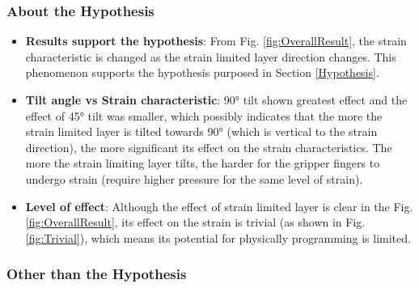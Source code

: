 \documentclass[conference]{IEEEtran}
\begin{document}
\subsubsection{About the Hypothesis}
\begin{itemize}
    \item \textbf{Results support the hypothesis}: From Fig. \ref{fig:OverallResult}, the strain characteristic is changed as the strain limited layer direction changes. This phenomenon supports the hypothesis purposed in Section \ref{Hypothesis}. 
    \item \textbf{Tilt angle vs Strain characteristic}: 90° tilt shown greatest effect and the effect of 45° tilt was smaller, which possibly indicates that the more the strain limited layer is tilted towards 90° (which is vertical to the strain direction), the more significant its effect on the strain characteristics. The more the strain limiting layer tilts, the harder for the gripper fingers to undergo strain (require higher pressure for the same level of strain). 
    \item \textbf{Level of effect}: Although the effect of strain limited layer is clear in the Fig. \ref{fig:OverallResult}, its effect on the strain is trivial (as shown in Fig. \ref{fig:Trivial}), which means its potential for physically programming is limited.
\end{itemize}

\subsubsection{Other than the Hypothesis}
\label{OtherThanTheHypothesis}
\end{document}
